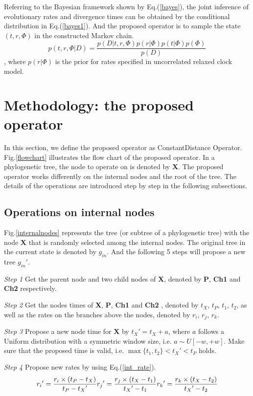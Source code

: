 \documentclass{bmcart}
\begin{document}
Referring to the Bayesian framework shown by Eq.(\ref{bayes}), the joint inference of evolutionary rates and divergence times can be obtained by the conditional distribution in Eq.(\ref{bayes1}). And the proposed operator is to sample the state $(t,r,\Phi)$ in the constructed Markov chain.
\begin{equation}\label{bayes1}
p(t,r,\Phi |D) = \frac{{p(D|t,r,\Phi )p(r|\Phi )p(t|\Phi )p(\Phi )}}{{p(D)}}
\end{equation}
, where $p(r|\Phi )$ is the prior for rates specified in uncorrelated relaxed clock model.
\section*{Methodology: the proposed operator}
In this section, we define the proposed operator as ConstantDistance Operator. Fig.\ref{flowchart} illustrates the flow chart of the proposed operator. In a phylogenetic tree, the node to operate on is denoted by \textbf{X}. The proposed operator works differently on the internal nodes and the root of the tree. The details of the operations are introduced step by step in the following subsections.
\subsection*{Operations on internal nodes}
Fig.\ref{internalnodes} represents the tree (or subtree of a phylogenetic tree) with the node \textbf{X} that is randomly selected among the internal nodes. The original tree in the current state is denoted by $g_{in}$. And the following 5 steps will propose a new tree ${g_{in}}'$.

\emph{Step 1} Get the parent node and two child nodes of \textbf{X}, denoted by \textbf{P}, \textbf{Ch1} and \textbf{Ch2} respectively.

\emph{Step 2} Get the nodes times of \textbf{X}, \textbf{P}, \textbf{Ch1} and \textbf{Ch2} , denoted by $t_X$, $t_P$, $t_1$, $t_2$, as well as the rates on the branches above the nodes, denoted by $r_i$, $r_j$, $r_k$.

\emph{Step 3} Propose a new node time for \textbf{X} by ${t_X}' = {t_X} + a$, where $a$ follows a Uniform distribution with a symmetric window size, i.e. $a \sim U[ - w, + w]$. Make sure that the proposed time is valid, i.e. $\max \{ {t_1},{t_2}\}  < {t_X}' < {t_P}$ holds.

\emph{Step 4} Propose new rates by using Eq.(\ref{int_rate}).
\begin{equation}
 \label{int_rate}
{r_i}' = \frac{{r_i} \times ({{t_P} - {t_X}})}{{{t_P} - {t_X}'}}\\
{r_j}' = \frac{{{r_j} \times ({{t_X} - {t_1}})}}{{{t_X}' - {t_1}}}\\
{r_k}' = \frac{{{r_k} \times ({{t_X} - {t_2}})}}{{{t_X}' - {t_2}}}
 \end{equation}
\end{document}
